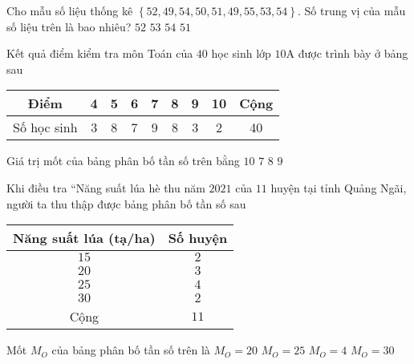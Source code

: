 \begin{ex}%
Cho mẫu số liệu thống kê $\left\lbrace 52,49,54,50,51,49,55,53,54\right\rbrace$. Số trung vị của mẫu số liệu trên là bao nhiêu?	
	\choice
	{\True $52$}
	{$53$}
	{$54$}
	{$51$}
\end{ex}

\begin{ex}%
Kết quả điểm kiểm tra môn Toán của $40$ học sinh lớp $10 \mathrm{A}$ được trình bày ở bảng sau
\begin{center}
\begin{tabular}{|c|c|c|c|c|c|c|c|c|}
	\hline Điểm & 4 & 5 & 6 & 7 & 8 & 9 & 10 & Cộng \\
	\hline Số học sinh & 3 & 8 & 7 & 9 & 8 & 3 & 2 & 40 \\
	\hline
\end{tabular}
\end{center}
Giá trị mốt của bảng phân bố tần số trên bằng
	\choice
	{$10$}
	{\True $7$}
	{$8$}
	{$9$}
\end{ex}

\begin{ex}%
Khi điều tra “Năng suất lúa hè thu năm $2021$ của $11$ huyện tại tỉnh Quảng Ngãi, người ta thu thập được bảng phân bố tần số sau
\begin{center}
	\begin{tabular}{|c|c|}
		\hline
		Năng suất lúa (tạ/ha) & Số huyện \\
		\hline
		$15$ & $2$ \\
		\hline
		$20$ & $3$ \\
		\hline
		$25$ & $4$ \\
		\hline
		$30$ & $2$ \\
		\hline
		Cộng & $11$ \\
		\hline
	\end{tabular}
\end{center}
Mốt $M_O$ của bảng phân bố tần số trên là
\choice
{$M_O=20$}
{\True $M_O=25$}
{$M_O=4$}
{$M_O=30$}
\end{ex}

